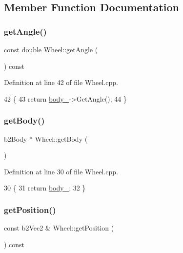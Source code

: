 \subsection{Member Function Documentation}
\mbox{\label{classWheel_a5bc6a7580f38a4ea08ba8d1bff79178a}} 
\subsubsection{\texorpdfstring{get\+Angle()}{getAngle()}}
{\footnotesize\ttfamily const double Wheel\+::get\+Angle (\begin{DoxyParamCaption}{ }\end{DoxyParamCaption}) const}



Definition at line 42 of file Wheel.\+cpp.


\begin{DoxyCode}
42                                    \{
43     \textcolor{keywordflow}{return} \hyperlink{classWheel_a155ed4c915b672ca1dd3a6fdd51ff6e9}{body\_}->GetAngle();
44 \}
\end{DoxyCode}
\mbox{\label{classWheel_af278d5423746dfc46834ec6b225d4e17}} 
\subsubsection{\texorpdfstring{get\+Body()}{getBody()}}
{\footnotesize\ttfamily b2\+Body $\ast$ Wheel\+::get\+Body (\begin{DoxyParamCaption}{ }\end{DoxyParamCaption})}



Definition at line 30 of file Wheel.\+cpp.


\begin{DoxyCode}
30                        \{
31     \textcolor{keywordflow}{return} \hyperlink{classWheel_a155ed4c915b672ca1dd3a6fdd51ff6e9}{body\_};
32 \}
\end{DoxyCode}
\mbox{\label{classWheel_a645ce5d8595047c6774f936794e3f543}} 
\subsubsection{\texorpdfstring{get\+Position()}{getPosition()}}
{\footnotesize\ttfamily const b2\+Vec2 \& Wheel\+::get\+Position (\begin{DoxyParamCaption}{ }\end{DoxyParamCaption}) const}



